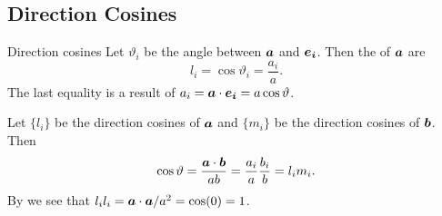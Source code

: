 \documentclass[a4paper]{article}
\begin{document}
    \subsection{Direction Cosines}
    \begin{definition}{Direction cosines}{}
        Let \(\vartheta_i\) be the angle between \(\bm{a}\) and \(\bm{e_{i}}\).
        Then the  of \(\bm{a}\) are
        \[l_i = \cos\vartheta_i = \frac{a_i}{a}.\]
        The last equality is a result of \(a_i = \bm{a}\cdot\bm{e_{i}} = a\cos\vartheta\).
    \end{definition}
    Let \(\{l_i\}\) be the direction cosines of \(\bm{a}\) and \(\{m_i\}\) be the direction cosines of \(\bm{b}\).
    Then
    \[\cos\vartheta = \frac{\bm{a}\cdot\bm{b}}{ab} = \frac{a_i}{a}\frac{b_i}{b} = l_im_i.\]
    By we see that \(l_il_i = \bm{a}\cdot\bm{a} / a^2 = \cos(0) = 1\).
    
\end{document}
